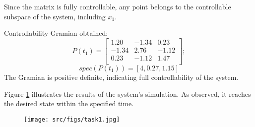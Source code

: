 Since the matrix is fully controllable, any point belongs to the controllable subspace of the system, including \(x_1\).

Controllability Gramian obtained:
\[
        P(t_1) = \begin{bmatrix}
        1.20 & -1.34 & 0.23 \\
        -1.34 & 2.76 & -1.12 \\
        0.23 & -1.12 & 1.47 \\
        \end{bmatrix};
\]
\[
        spec(P(t_1)) = [4, 0.27, 1.15]
\]The Gramian is positive definite, indicating full controllability of the system.

Figure \ref{fig:task1} illustrates the results of the system's simulation. As observed, it reaches the desired state within the specified time.
\begin{figure}[ht!]
        \centering
        \texttt{[image: src/figs/task1.jpg]}
        \label{fig:task1}
\end{figure}
